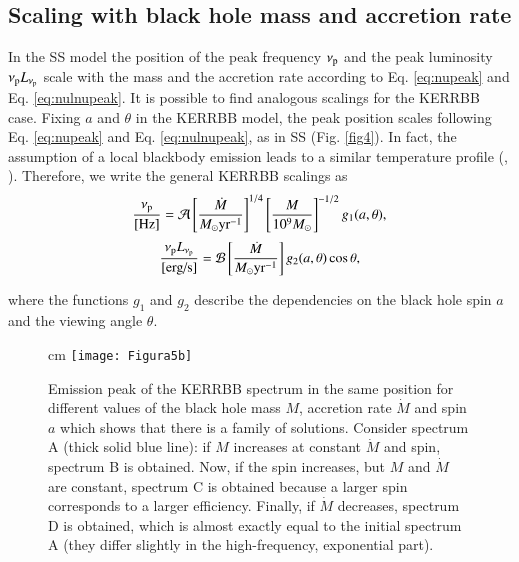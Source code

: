 \documentclass{aa}
\begin{document}

\subsection{Scaling with black hole mass and accretion rate} \label{scale}

In the SS model the position of the peak frequency $\nu_{\rm p}$ and the peak luminosity $\nu_{\rm p} L_{\nu_{\rm p}}$ scale with the mass and the accretion rate according to Eq. \eqref{eq:nupeak} and Eq. \eqref{eq:nulnupeak}. It is possible to find analogous scalings for the KERRBB case. Fixing $a$ and $\theta$ in the KERRBB model, the peak position scales following Eq. \eqref{eq:nupeak} and Eq. \eqref{eq:nulnupeak}, as in SS (Fig. \ref{fig4}). In fact, the assumption of a local blackbody emission leads to a similar temperature profile (\citealt{NovTho}, \citealt{PageTho}). Therefore, we write the general KERRBB scalings as
	\begin{equation} \label{eq:nupeak2}
		\frac{\nu_{\rm p}}{\text{[Hz]}} = \mathcal{A} \left[ \frac{\dot{M}}{M_{\odot} \text{yr}^{-1}} \right]^{1/4} 
\left[\frac{M}{10^9 M_{\odot}} \right]^{-1/2} g_1(a, \theta),
	\end{equation}
	\begin{equation} \label{eq:nulnupeak2}
		\frac{\nu_{\rm p} L_{\nu_{\rm p}}}{\text{[erg/s]}} = \mathcal{B} \left[ \frac{\dot{M}}{M_{\odot} \text{yr}^{-1}} \right] g_2(a, \theta) \cos \theta,
	\end{equation}

\noindent where the functions $g_1$ and $g_2$ describe the dependencies on the black hole spin $a$ and the viewing angle $\theta$. 

\begin{figure}
\centering
{} cm
\texttt{[image: Figura5b]}
\caption{
Emission peak of the KERRBB spectrum in the same position for different values of the black hole mass $M$, accretion rate $\dot M$ and spin $a$ which shows that there is a family of solutions. Consider spectrum A (thick solid blue line): if $M$ increases at constant $\dot M$ and spin, spectrum B is obtained. Now, if the spin increases, but $M$ and $\dot M$ are constant, spectrum C is obtained because a larger spin corresponds to a larger efficiency. Finally, if $\dot M$ decreases, spectrum D is obtained, which is almost exactly equal to the initial spectrum A (they differ slightly in the high-frequency, exponential part). 
}
\label{fig:figura5b}
\end{figure}
\end{document}
